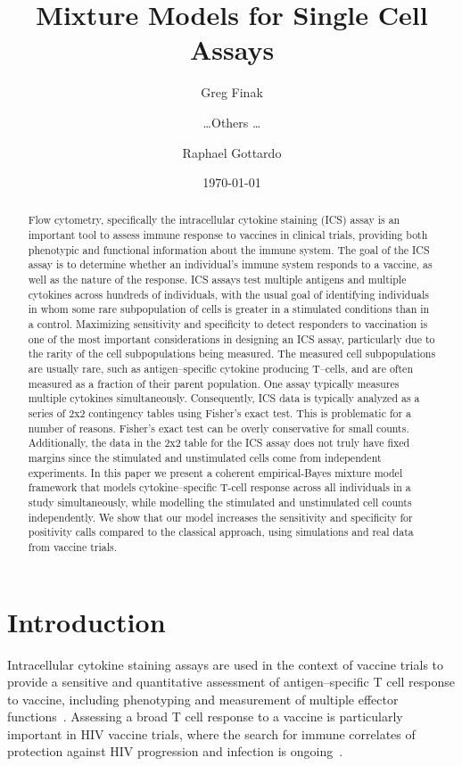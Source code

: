 \documentclass[11pt]{article}
\title{Mixture Models for Single Cell Assays}
\author[1]{Greg Finak}
\author[1]{\ldots Others \ldots}
\author[1]{Raphael Gottardo}
\affil[1]{Vaccine and Infectious Disease Division, Fred Hutchinson Cancer Research Center (FHCRC), Seattle, WA}
\date{\today}
\begin{document}
\maketitle
\begin{abstract}
Flow cytometry, specifically the intracellular cytokine staining (ICS) assay is an important tool to assess immune response to vaccines in clinical trials, providing both phenotypic and functional information about the immune system. The goal of the ICS assay is to determine whether an individual's immune system responds to a vaccine, as well as the nature of the response. ICS assays test multiple antigens and multiple cytokines across hundreds of individuals, with the usual goal of identifying individuals in whom some rare subpopulation of cells is greater in a stimulated conditions than in a control. Maximizing sensitivity and specificity to detect responders to vaccination is one of the most important considerations in designing an ICS assay, particularly due to the rarity of the cell subpopulations being measured. The measured cell subpopulations are usually rare, such as antigen--specific cytokine producing T--cells, and are often measured as a fraction of their parent population. One assay typically measures multiple cytokines simultaneously. Consequently, ICS data is typically analyzed as a series of 2x2 contingency tables using Fisher's exact test. This is problematic for a number of reasons. Fisher's exact test can be overly conservative for small counts. Additionally, the data in the 2x2 table for the ICS assay does not truly have fixed margins since the stimulated and unstimulated cells come from independent experiments. In this paper we present a coherent empirical-Bayes mixture model framework that models cytokine–specific T-cell response across all individuals in a study simultaneously, while modelling the stimulated and unstimulated cell counts independently. We show that our model increases the sensitivity and specificity for positivity calls compared to the classical approach, using simulations and real data from vaccine trials.

\end{abstract}
\section{Introduction}
Intracellular cytokine staining assays are used in the context of vaccine trials to provide a sensitive and quantitative assessment of antigen--specific T cell response to vaccine, including phenotyping and measurement of multiple effector functions~\cite{Horton:2007tsa,DeRosa:2004wp,Betts:2006dw}. Assessing a broad T cell response to a vaccine is particularly important in HIV vaccine trials, where the search for immune correlates of protection against HIV progression and infection is ongoing~\cite{Plotkin:2010ve,Horton:2007tsa,Kim:2010fw}.
\end{document}
